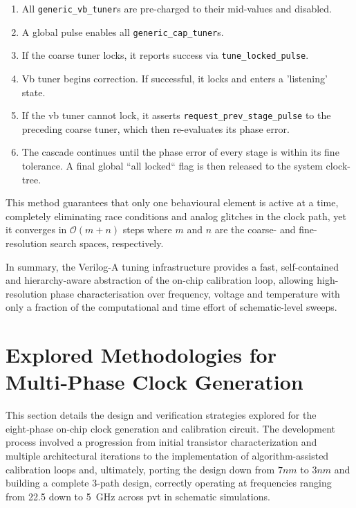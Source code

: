 \begin{enumerate}
  \item All \texttt{generic\_vb\_tuner}s are pre-charged to their
        mid-values and disabled.
  \item A global pulse enables all \texttt{generic\_cap\_tuner}s.
  \item If the coarse tuner locks, it reports success via \texttt{tune\_locked\_pulse}.
  \item Vb tuner begins correction. If successful, it locks and enters a 'listening' state.
  \item If the vb tuner cannot lock, it asserts \texttt{request\_prev\_stage\_pulse} to
        the preceding coarse tuner, which then re-evaluates its phase error.
  \item The cascade continues until the phase error of every stage is within its
        fine tolerance. A final global ``all locked`` flag is then released to the
        system clock-tree.
\end{enumerate}

This method guarantees that only one behavioural element is active at a
time, completely eliminating race conditions and analog
 glitches in the clock
path, yet it converges in $\mathcal{O}(m+n)$ steps where
\(m\) and \(n\) are the coarse- and fine-resolution search spaces, respectively.

\vspace{1em}
In summary, the Verilog-A tuning infrastructure provides a fast,
self-contained and hierarchy-aware abstraction of the on-chip calibration loop,
allowing high-resolution phase characterisation over frequency, voltage and
temperature with only a fraction of the computational and time effort of schematic-level
sweeps.

\section{Explored Methodologies for Multi‑Phase Clock Generation}\label{sec:methodology}

This section details the design and verification strategies explored for the eight‑phase on‑chip clock generation and calibration circuit. The development process involved a progression from initial transistor characterization and multiple architectural iterations to the implementation of algorithm-assisted calibration loops and, ultimately, porting the design down from $7 nm$ to $3 nm$ and building a complete 3-path design, correctly operating at frequencies ranging from 22.5 down to 5~GHz across \gls{pvt} in schematic simulations.

